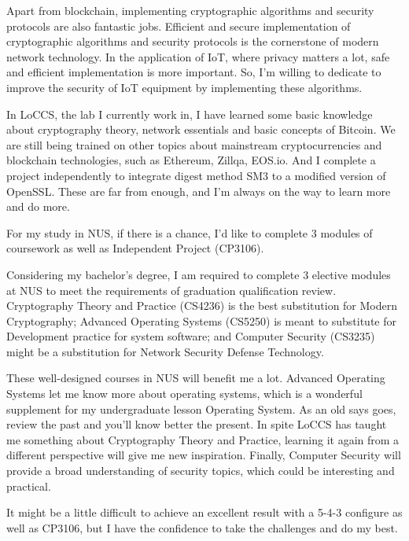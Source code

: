 \begin{cvletter}
    Apart from blockchain, implementing cryptographic algorithms and security protocols are also fantastic jobs. Efficient and secure implementation of cryptographic algorithms and security protocols is the cornerstone of modern network technology. In the application of IoT, where privacy matters a lot, safe and efficient implementation is more important. So, I'm willing to dedicate to improve the security of IoT equipment by implementing these algorithms.

    In LoCCS, the lab I currently work in, I have learned some basic knowledge about cryptography theory, network essentials and basic concepts of Bitcoin. We are still being trained on other topics about mainstream cryptocurrencies and blockchain technologies, such as Ethereum, Zillqa, EOS.io. And I complete a project independently to integrate digest method SM3 to a modified version of OpenSSL. These are far from enough, and I'm always on the way to learn more and do more.



    For my study in NUS, if there is a chance, I'd like to complete 3 modules of coursework as well as Independent Project (CP3106).

    Considering my bachelor's degree, I am required to complete 3 elective modules at NUS to meet the requirements of graduation qualification review. Cryptography Theory and Practice (CS4236) is the best substitution for Modern Cryptography; Advanced Operating Systems (CS5250) is meant to substitute for Development practice for system software; and Computer Security (CS3235) might be a substitution for Network Security Defense Technology.

    These well-designed courses in NUS will benefit me a lot. Advanced Operating Systems let me know more about operating systems, which is a wonderful supplement for my undergraduate lesson Operating System. As an old says goes, review the past and you'll know better the present. In spite LoCCS has taught me something about Cryptography Theory and Practice, learning it again from a different perspective will give me new inspiration. Finally, Computer Security will provide a broad understanding of security topics, which could be interesting and practical.

    It might be a little difficult to achieve an excellent result with a 5-4-3 configure as well as CP3106, but I have the confidence to take the challenges and do my best.


\end{cvletter}